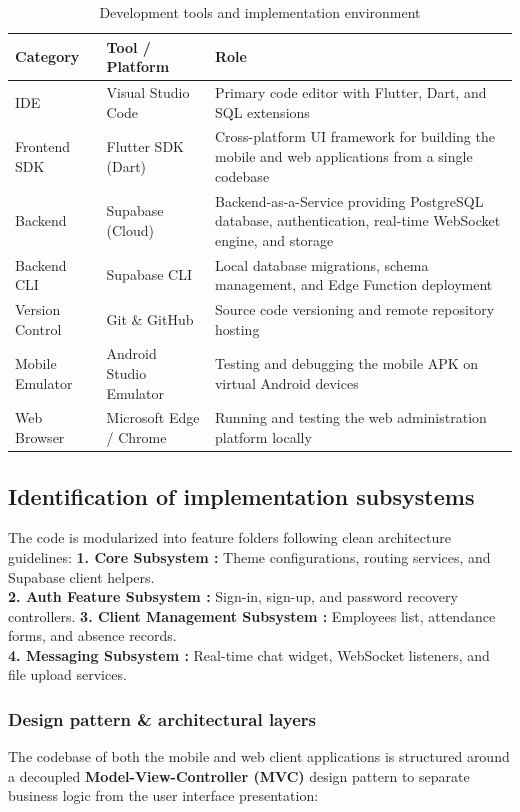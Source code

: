\begin{table}[H]
\centering
\caption{Development tools and implementation environment}
\label{tab:impl_env}
\begin{tabular}{|l|p{3.5cm}|p{7cm}|}
\hline
\textbf{Category} & \textbf{Tool / Platform} & \textbf{Role} \\
\hline
IDE & Visual Studio Code & Primary code editor with Flutter, Dart, and SQL extensions \\
\hline
Frontend SDK & Flutter SDK (Dart) & Cross-platform UI framework for building the mobile and web applications from a single codebase \\
\hline
Backend & Supabase (Cloud) & Backend-as-a-Service providing PostgreSQL database, authentication, real-time WebSocket engine, and storage \\
\hline
Backend CLI & Supabase CLI & Local database migrations, schema management, and Edge Function deployment \\
\hline
Version Control & Git \& GitHub \cite{GitHub} & Source code versioning and remote repository hosting \\
\hline
Mobile Emulator & Android Studio Emulator & Testing and debugging the mobile APK on virtual Android devices \\
\hline
Web Browser & Microsoft Edge / Chrome & Running and testing the web administration platform locally \\
\hline
\end{tabular}
\end{table}

\subsection{Identification of implementation subsystems}
The code is modularized into feature folders following clean architecture guidelines:
\textbf{1. Core Subsystem :} Theme configurations, routing services, and Supabase client helpers.\\
\textbf{2. Auth Feature Subsystem :}  Sign-in, sign-up, and password recovery controllers.
\textbf{3. Client Management Subsystem :} Employees list, attendance forms, and absence records.\\
\textbf{4. Messaging Subsystem :} Real-time chat widget, WebSocket listeners, and file upload services.

\subsubsection{Design pattern \& architectural layers}
The codebase of both the mobile and web client applications is structured around a decoupled \textbf{Model-View-Controller (MVC)} design pattern \cite{Gamma1994} to separate business logic from the user interface presentation:

